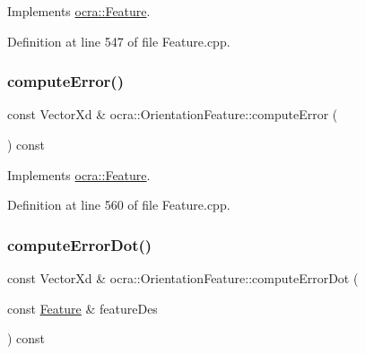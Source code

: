 Implements \hyperlink{classocra_1_1Feature_aaa74d6869f7e574fcc39d443581ddf77}{ocra\+::\+Feature}.



Definition at line 547 of file Feature.\+cpp.

\hypertarget{classocra_1_1OrientationFeature_a0663495ff0bd6a9b01330ce4372b56ab}{}\label{classocra_1_1OrientationFeature_a0663495ff0bd6a9b01330ce4372b56ab} 
\subsubsection{\texorpdfstring{compute\+Error()}{computeError()}\hspace{0.1cm}{\footnotesize\ttfamily [2/2]}}
{\footnotesize\ttfamily const Vector\+Xd \& ocra\+::\+Orientation\+Feature\+::compute\+Error (\begin{DoxyParamCaption}{ }\end{DoxyParamCaption}) const\hspace{0.3cm}{\ttfamily [virtual]}}



Implements \hyperlink{classocra_1_1Feature_a88f87b496aedc7bf9f13b19bb8f9c7fa}{ocra\+::\+Feature}.



Definition at line 560 of file Feature.\+cpp.

\hypertarget{classocra_1_1OrientationFeature_a49fd73d3b8dd5eb2f26c32c3c4440644}{}\label{classocra_1_1OrientationFeature_a49fd73d3b8dd5eb2f26c32c3c4440644} 
\subsubsection{\texorpdfstring{compute\+Error\+Dot()}{computeErrorDot()}\hspace{0.1cm}{\footnotesize\ttfamily [1/2]}}
{\footnotesize\ttfamily const Vector\+Xd \& ocra\+::\+Orientation\+Feature\+::compute\+Error\+Dot (\begin{DoxyParamCaption}\item[{const \hyperlink{classocra_1_1Feature}{Feature} \&}]{feature\+Des }\end{DoxyParamCaption}) const\hspace{0.3cm}{\ttfamily [virtual]}}



